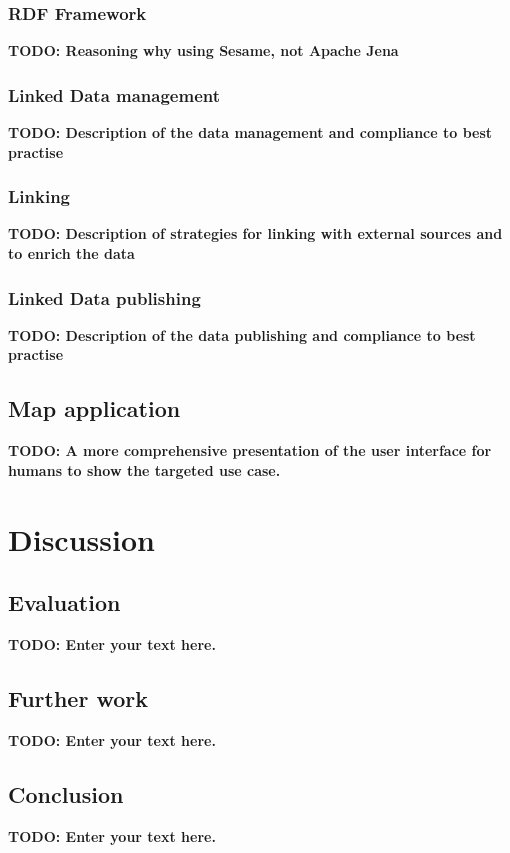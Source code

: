 \documentclass[draft,final]{vutinfth} %
\newcommand{\todo}[1]{{\color{red}\textbf{TODO: {#1}}}} %
\begin{document}
\subsection{RDF Framework}
\todo{Reasoning why using Sesame, not Apache Jena}

\subsection{Linked Data management}
\todo{Description of the data management and compliance to best practise}

\subsection{Linking}
\todo{Description of strategies for linking with external sources and to enrich the data}

\subsection{Linked Data publishing}
\todo{Description of the data publishing and compliance to best practise}

\section{Map application}
\label{solution-map-application}
\todo{A more comprehensive presentation of the user interface for humans to show the targeted use case.}

\chapter{Discussion}
\label{discussion-chapter}

\section{Evaluation}
\todo{Enter your text here.}

\section{Further work}
\todo{Enter your text here.}

\section{Conclusion}

\todo{Enter your text here.}

\backmatter

\listoffigures %

\listoftables %

\listofalgorithms
{}

\printindex

\printglossaries



\end{document}

